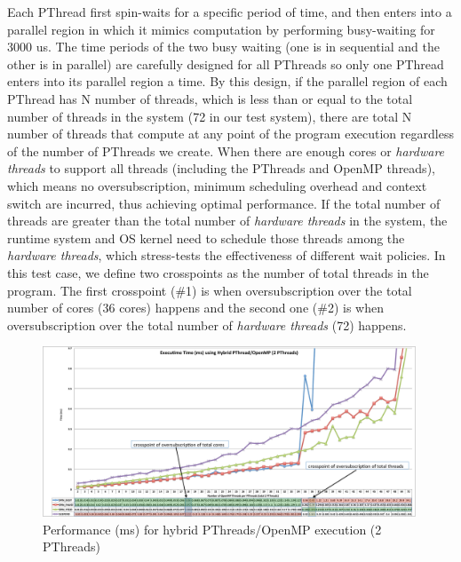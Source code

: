Each PThread first spin-waits for a specific period of time, and  
then enters into a {\sf parallel} region in which it mimics computation by performing busy-waiting for 3000 us.
The time periods of the two busy waiting (one is in sequential and the other is in {\sf parallel}) are carefully designed for
all PThreads so only one PThread enters into its {\sf parallel} region a time. 
By this design, if the {\sf parallel} region of each PThread has N number of threads, which is less than or equal to 
the total number of threads in the system (72 in our test system), there are total N number of threads that compute  
at any point of the program execution regardless of the number of PThreads we create. 
When there are enough cores or {\it hardware threads} to support all threads (including the PThreads and OpenMP threads),
which means no oversubscription, minimum scheduling overhead and context switch are incurred, thus achieving optimal 
performance. If the total number of threads are 
greater than the total number of {\it hardware threads} in the system, the runtime system and OS kernel 
need to schedule those threads among the {\it hardware threads}, which stress-tests the effectiveness of different wait policies. 
In this test case, we define two crosspoints as the number of total threads in the program. 
The first crosspoint (\#1) is when oversubscription
over the total number of cores (36 cores) happens and the second one (\#2) is when oversubscription
over the total number of {\it hardware threads} (72) happens. 


\begin{figure}[h]
    \includegraphics[width=0.99\textwidth] {images/2PThread_performance}
    \caption{Performance (ms) for hybrid PThreads/OpenMP execution (2 PThreads)}
    \label{fig:2PThread_performance}
\end{figure}

